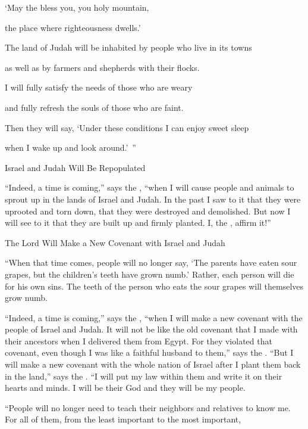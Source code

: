 {\par }{\Q ‘May
the {}
bless
you, you holy
mountain,
\par }{\Q the place where righteousness
dwells.’
\par }{\Q {}The land of Judah
will be inhabited
by people who live
in its towns
\par }{\Q as well as by farmers
and shepherds with their flocks.
\par }{\Q {}I will fully
satisfy
the needs of those who
are
weary
\par }{\Q and fully
refresh the souls
of those who are faint.
\par }{\Q {}Then they will say, ‘Under these conditions
I can enjoy
sweet
sleep
\par }{\Q when I wake up
and look around.’ ”
\par }{\SH Israel and Judah Will Be Repopulated
\par }{\PP {}“Indeed,
a time
is coming,”
says
the {}, “when I will cause
people
and animals
to sprout
up in the lands of Israel
and Judah.
In the past I saw
to it that
they were uprooted
and torn down,
that they were destroyed
and demolished.
But now I will see
to it that they are built up
and firmly planted.
I, the
{}, affirm it!”
\par }{\SH The Lord Will Make a New Covenant with Israel and Judah
\par }{\PP {}“When that time
comes, people will no
longer
say,
‘The parents
have eaten
sour grapes,
but the children’s
teeth
have grown numb.’
Rather, each person
will die
for his own sins.
The teeth
of the person
who eats
the sour grapes
will themselves grow numb.
\par }{\PP {}“Indeed,
a time
is coming,”
says
the {}, “when I will make
a new
covenant
with
the people of
Israel
and Judah.
It will not
be like the old covenant
that
I made
with
their ancestors
when
I delivered
them from
Egypt.
For they
violated
that covenant,
even though I
was like a faithful husband
to them,” says
the {}.
“But
I will make a new covenant
with
the whole nation
of Israel
after
I plant
them
back in the land,” says
the {}. “I will put
my law
within
them and write
it on
their hearts
and minds. I will be
their God
and they
will be
my people.
\par }{\PP {}“People
will no
longer
need
to teach
their neighbors
and relatives
to know
me. For
all
of them,
from the least
important
to the most important,
}
